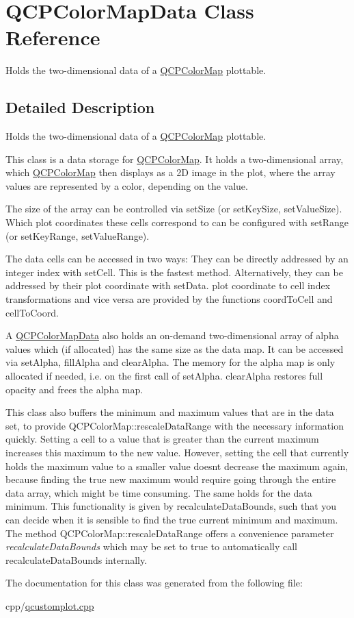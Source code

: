 \hypertarget{class_q_c_p_color_map_data}{}\section{Q\+C\+P\+Color\+Map\+Data Class Reference}
\label{class_q_c_p_color_map_data}


Holds the two-\/dimensional data of a \mbox{\hyperlink{class_q_c_p_color_map}{Q\+C\+P\+Color\+Map}} plottable.  




\subsection{Detailed Description}
Holds the two-\/dimensional data of a \mbox{\hyperlink{class_q_c_p_color_map}{Q\+C\+P\+Color\+Map}} plottable. 

This class is a data storage for \mbox{\hyperlink{class_q_c_p_color_map}{Q\+C\+P\+Color\+Map}}. It holds a two-\/dimensional array, which \mbox{\hyperlink{class_q_c_p_color_map}{Q\+C\+P\+Color\+Map}} then displays as a 2D image in the plot, where the array values are represented by a color, depending on the value.

The size of the array can be controlled via set\+Size (or set\+Key\+Size, set\+Value\+Size). Which plot coordinates these cells correspond to can be configured with set\+Range (or set\+Key\+Range, set\+Value\+Range).

The data cells can be accessed in two ways\+: They can be directly addressed by an integer index with set\+Cell. This is the fastest method. Alternatively, they can be addressed by their plot coordinate with set\+Data. plot coordinate to cell index transformations and vice versa are provided by the functions coord\+To\+Cell and cell\+To\+Coord.

A \mbox{\hyperlink{class_q_c_p_color_map_data}{Q\+C\+P\+Color\+Map\+Data}} also holds an on-\/demand two-\/dimensional array of alpha values which (if allocated) has the same size as the data map. It can be accessed via set\+Alpha, fill\+Alpha and clear\+Alpha. The memory for the alpha map is only allocated if needed, i.\+e. on the first call of set\+Alpha. clear\+Alpha restores full opacity and frees the alpha map.

This class also buffers the minimum and maximum values that are in the data set, to provide Q\+C\+P\+Color\+Map\+::rescale\+Data\+Range with the necessary information quickly. Setting a cell to a value that is greater than the current maximum increases this maximum to the new value. However, setting the cell that currently holds the maximum value to a smaller value doesn\textquotesingle{}t decrease the maximum again, because finding the true new maximum would require going through the entire data array, which might be time consuming. The same holds for the data minimum. This functionality is given by recalculate\+Data\+Bounds, such that you can decide when it is sensible to find the true current minimum and maximum. The method Q\+C\+P\+Color\+Map\+::rescale\+Data\+Range offers a convenience parameter {\itshape recalculate\+Data\+Bounds} which may be set to true to automatically call recalculate\+Data\+Bounds internally. 

The documentation for this class was generated from the following file\+:\begin{DoxyCompactItemize}
\item 
cpp/\mbox{\hyperlink{qcustomplot_8cpp}{qcustomplot.\+cpp}}\end{DoxyCompactItemize}
